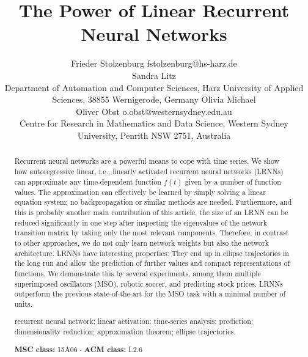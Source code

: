 \documentclass[twoside,11pt]{article}
\theoremstyle{definition}
\begin{document}
\title{The Power of Linear Recurrent Neural Networks}
\author{\name Frieder Stolzenburg \email fstolzenburg@hs-harz.de\\ %
	\name Sandra Litz\\ %
	\addr Department of Automation and Computer Sciences,
	Harz University of Applied Sciences,
	38855 Wernigerode, Germany
\AND	
	\name Olivia Michael\\ %
	\name Oliver Obst \email o.obst@westernsydney.edu.au\\ %
	\addr Centre for Research in Mathematics and Data Science,
	Western Sydney University,
	Penrith NSW 2751, Australia}
\editor{}
\maketitle

\begin{abstract}
Recurrent neural networks are a powerful means to cope with time series. We show
how autoregressive linear, i.e., linearly activated recurrent neural networks (LRNNs) can
approximate any time-dependent function $f(t)$ given by a number of function
values. The approximation can effectively be learned by simply solving a linear
equation system; no backpropagation or similar methods are needed. Furthermore,
and this is probably another main contribution of this article, the size of an
LRNN can be reduced significantly in one step after inspecting the eigenvalues
of the network transition matrix by taking only the most
relevant components. Therefore, in contrast to other approaches, we do not only
learn network weights but also the network architecture. LRNNs have interesting
properties: They end up in ellipse trajectories in the long run and allow the
prediction of further values and compact representations of functions. We
demonstrate this by several experiments, among them multiple superimposed
oscillators (MSO), robotic soccer, and predicting stock prices. LRNNs outperform
the previous state-of-the-art for the MSO task with a minimal number of units.

\smallskip
\begin{keywords}
recurrent neural network; linear activation; time-series analysis; prediction;
dimensionality reduction; approximation theorem; ellipse trajectories.
\end{keywords}

\smallskip
\noindent\textbf{MSC class:} 15A06 \;$\cdot$\; \textbf{ACM class:} I.2.6%
\end{abstract}
\end{document}

